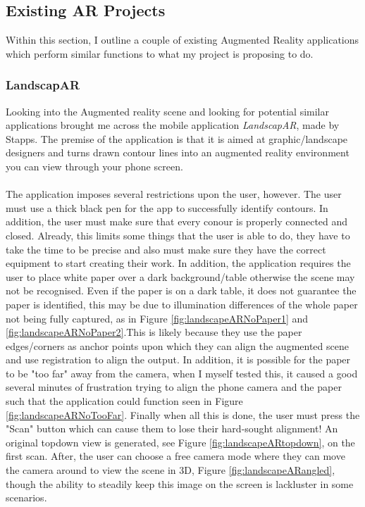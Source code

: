 \documentclass[11pt]{article}
\begin{document}
\subsection{Existing AR Projects}
Within this section, I outline a couple of existing Augmented Reality 
applications which perform similar functions to what my project is 
proposing to do.

\subsubsection{LandscapAR}
\label{LandscapAR}
Looking into the Augmented reality scene and looking for potential similar
applications brought me across the mobile application \textit{LandscapAR},
made by Stapps. The premise of the application is that it is aimed at
graphic/landscape designers and turns drawn contour lines into an augmented
reality environment you can view through your phone screen. \\
\\
The application imposes several restrictions upon the user, however. The user
must use a thick black pen for the app to successfully identify contours. 
In addition, the user must make sure that every conour is properly connected
and closed. Already, this limits some things that the user is able to do, they
have to take the time to be precise and also must make sure they have the 
correct equipment to start creating their work. In addition, the application
requires the user to place white paper over a dark background/table otherwise
the scene may not be recognised. Even if the paper is on a dark table, it 
does not guarantee the paper is identified, this may be due to illumination
differences of the whole paper not being fully captured, as in 
Figure \ref{fig:landscapeARNoPaper1} and \ref{fig:landscapeARNoPaper2}.This 
is likely because they use 
the paper edges/corners as anchor points upon which they can align the 
augmented scene and use registration to align the output. In addition, it
is possible for the paper to be "too far" away from the camera, when I
myself tested this, it caused a good several minutes of frustration trying
to align the phone camera and the paper such that the application could 
function seen in Figure \ref{fig:landscapeARNoTooFar}. 
Finally when all this is done, the user must press the "Scan" button
which can cause them to lose their hard-sought alignment! An original
topdown view is generated, see Figure \ref{fig:landscapeARtopdown}, on
the first scan. After, the user can choose a free camera mode where they 
can move the camera around to view the scene in 3D, 
Figure \ref{fig:landscapeARangled}, though the ability to steadily
keep this image on the screen is lackluster in some scenarios.  \\
\end{document}
